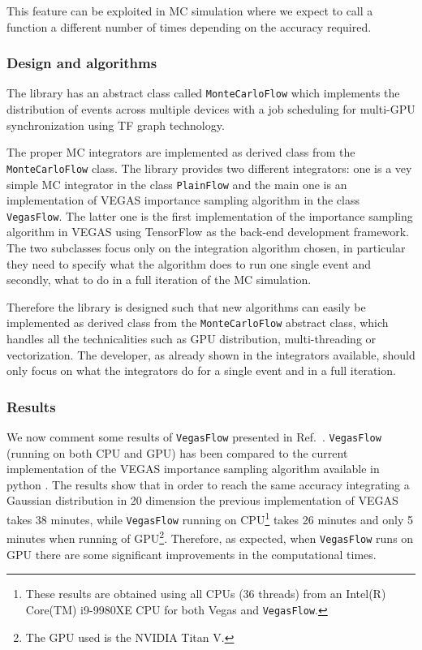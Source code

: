 \documentclass[../main/main.tex]{subfiles}
\begin{document}
This feature can be exploited in MC simulation where we expect to call a function a different number of times depending on the accuracy required. 

\subsubsection{Design and algorithms}
The library has an abstract class called \texttt{MonteCarloFlow} which implements the distribution
of events across multiple devices with a job scheduling for multi-GPU synchronization using TF graph technology.

The proper MC integrators are implemented as derived class from the \texttt{MonteCarloFlow} class. The library provides two different integrators: one is a vey simple MC integrator in the class \texttt{PlainFlow} and the main one is an implementation of VEGAS importance sampling algorithm in the class \texttt{VegasFlow}.
The latter one is the first implementation of the importance sampling algorithm in VEGAS using TensorFlow as the back-end development framework.
The two subclasses focus only on the integration algorithm chosen, in particular they need to specify what the algorithm does to run one single event and secondly, what to do in a full iteration of the MC simulation.

Therefore the library is designed such that new algorithms can easily be implemented as derived class from the \texttt{MonteCarloFlow} abstract class, which handles all the technicalities such as GPU distribution, multi-threading or vectorization.
The developer, as already shown in the integrators available, should only focus on what the integrators do for a single event and in a full iteration.

 
 \subsubsection{Results}
We now comment some results of \texttt{VegasFlow} presented in Ref.~\cite{Carrazza:2020rdn}.
\texttt{VegasFlow} (running on both CPU and GPU) has been compared to the current implementation of the VEGAS importance sampling algorithm available in python \cite{peter_lepage_2021_4746454}. The results show that in order to reach the same accuracy integrating a Gaussian distribution in 20 dimension the previous implementation of VEGAS takes  38 minutes, while \texttt{VegasFlow} running on CPU\footnote{These results are obtained using all CPUs (36 threads) from an Intel(R) Core(TM) i9-9980XE CPU for both Vegas and \texttt{VegasFlow}.} takes 26 minutes and only 5 minutes when running of GPU\footnote{The GPU used is the NVIDIA Titan V.}.
Therefore, as expected, when \texttt{VegasFlow} runs on GPU there are some significant improvements in the computational times.
\end{document}
